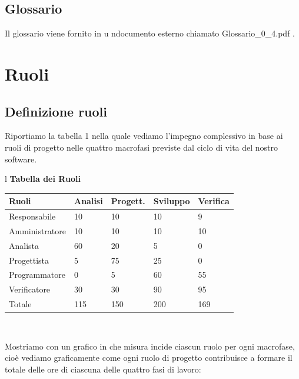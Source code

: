 \documentclass[11pt,titlepage,a4paper]{report}
\begin{document}
\section{Glossario}
Il glossario viene fornito in u ndocumento esterno chiamato  Glossario\_0\_4.pdf .

\chapter{Ruoli}
\section{Definizione ruoli}
Riportiamo la tabella 1 nella quale vediamo l'impegno
complessivo in base ai ruoli di progetto nelle quattro
macrofasi previste dal ciclo di vita del nostro software.


\begin{table}[hbtp]
\large{
\begin{tabular}{l}
\Large{\textbf{\textsf{Tabella dei Ruoli}}} \\
\begin{tabular}{||p{3cm}||p{2cm}||p{2cm}||p{2cm}||p{2cm}||}
\hline
\textbf{Ruoli} & \textbf{Analisi} & \textbf{Progett.} & \textbf{Sviluppo}
& \textbf{Verifica}\\
\hline
{Responsabile}&10&10&10&9 \\ 
\hline 
{Amministratore} &10&10&10&10\\ 
\hline
{Analista}& 60&20&5&0 \\
\hline
{Progettista}&5&75&25&0 \\
\hline
{Programmatore}& 0&5&60&55 \\
\hline
{Verificatore}& 30&30&90&95 \\
\hline
{Totale}& 115&150&200&169 \\
\hline
\end{tabular} \\
\end{tabular}
}
\end{table}

\newpage

Mostriamo con un grafico in che misura incide ciascun ruolo per ogni macrofase,
cio\`e vediamo graficamente come ogni ruolo di progetto contribuisce a formare 
il totale delle ore di ciascuna delle quattro fasi di lavoro:
\end{document}
